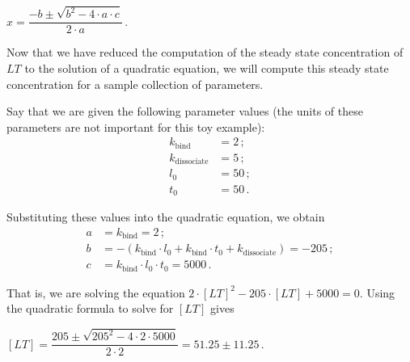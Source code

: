 \begin{center}
$x = \dfrac{-b \pm \sqrt{b^2 - 4 \cdot a \cdot c}}{2 \cdot a}$\,.
\end{center}

\fudgespace

\begin{qbox}\end{qbox}

Now that we have reduced the computation of the steady state concentration of $LT$ to the solution of a quadratic equation, we will compute this steady state concentration for a sample collection of parameters.

Say that we are given the following parameter values (the units of these parameters are not important for this toy example):
\begin{align*}
k_\text{bind} & = 2\,;\\
k_\text{dissociate} & = 5\,;\\
l_0 & = 50\,;\\
t_0 & = 50\,.
\end{align*}


\noindent Substituting these values into the quadratic equation, we obtain
\begin{align*}
a & = k_\text{bind} = 2\,;\\
b & = - (k_\text{bind} \cdot l_0 + k_\text{bind} \cdot t_0 + k_\text{dissociate}) = -205\,;\\
c & = k_\text{bind} \cdot l_0 \cdot t_0 = 5000\,.
\end{align*}

\noindent That is, we are solving the equation $2 \cdot [LT]^2 - 205 \cdot [LT] + 5000 = 0$. Using the quadratic formula to solve for $[LT]$ gives

\begin{center}
$[LT] = \dfrac{205 \pm \sqrt{205^2 - 4 \cdot 2 \cdot 5000}}{2 \cdot 2} = 51.25 \pm 11.25$\,.
\end{center}

